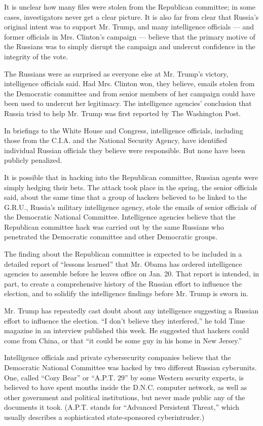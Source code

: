 It is unclear how many files were stolen from the Republican committee;
in some cases, investigators never get a clear picture. It is also far
from clear that Russia's original intent was to support Mr. Trump, and
many intelligence officials --- and former officials in Mrs. Clinton's
campaign --- believe that the primary motive of the Russians was to
simply disrupt the campaign and undercut confidence in the integrity of
the vote.

The Russians were as surprised as everyone else at Mr. Trump's victory,
intelligence officials said. Had Mrs. Clinton won, they believe, emails
stolen from the Democratic committee and from senior members of her
campaign could have been used to undercut her legitimacy. The
intelligence agencies' conclusion that Russia tried to help Mr. Trump
was first reported by The Washington Post.

In briefings to the White House and Congress, intelligence officials,
including those from the C.I.A. and the National Security Agency, have
identified individual Russian officials they believe were responsible.
But none have been publicly penalized.

It is possible that in hacking into the Republican committee, Russian
agents were simply hedging their bets. The attack took place in the
spring, the senior officials said, about the same time that a group of
hackers believed to be linked to the G.R.U., Russia's military
intelligence agency, stole the emails of senior officials of the
Democratic National Committee. Intelligence agencies believe that the
Republican committee hack was carried out by the same Russians who
penetrated the Democratic committee and other Democratic groups.

The finding about the Republican committee is expected to be included in
a detailed report of ``lessons learned'' that Mr. Obama has ordered
intelligence agencies to assemble before he leaves office on Jan. 20.
That report is intended, in part, to create a comprehensive history of
the Russian effort to influence the election, and to solidify the
intelligence findings before Mr. Trump is sworn in.

Mr. Trump has repeatedly cast doubt about any intelligence suggesting a
Russian effort to influence the election. ``I don't believe they
interfered,'' he told Time magazine in an interview published this week.
He suggested that hackers could come from China, or that ``it could be
some guy in his home in New Jersey.''

Intelligence officials and private cybersecurity companies believe that
the Democratic National Committee was hacked by two different Russian
cyberunits. One, called ``Cozy Bear'' or ``A.P.T. 29'' by some Western
security experts, is believed to have spent months inside the D.N.C.
computer network, as well as other government and political
institutions, but never made public any of the documents it took.
(A.P.T. stands for ``Advanced Persistent Threat,'' which usually
describes a sophisticated state-sponsored cyberintruder.)

